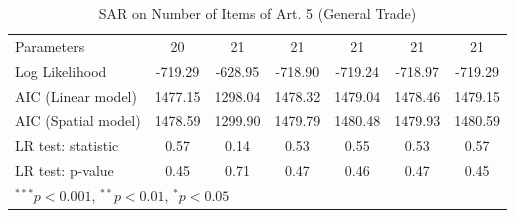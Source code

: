 \begin{table}[!h]
\begin{center}
\begin{tabular}{l c c c c c c }
Parameters              & 20           & 21           & 21           & 21           & 21           & 21           \\
Log Likelihood          & -719.29      & -628.95      & -718.90      & -719.24      & -718.97      & -719.29      \\
AIC (Linear model)      & 1477.15      & 1298.04      & 1478.32      & 1479.04      & 1478.46      & 1479.15      \\
AIC (Spatial model)     & 1478.59      & 1299.90      & 1479.79      & 1480.48      & 1479.93      & 1480.59      \\
LR test: statistic      & 0.57         & 0.14         & 0.53         & 0.55         & 0.53         & 0.57         \\
LR test: p-value        & 0.45         & 0.71         & 0.47         & 0.46         & 0.47         & 0.45         \\
\bottomrule
\multicolumn{7}{l}{\scriptsize{$^{***}p<0.001$, $^{**}p<0.01$, $^*p<0.05$}}
\end{tabular}
\caption{SAR on Number of Items of Art. 5 (General Trade)}
\label{table:coefficients}
\end{center}
\end{table}
